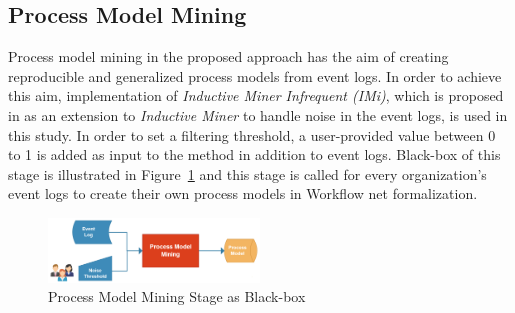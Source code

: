 \subsection{Process Model Mining}
\label{subsec:process-model-mining}
Process model mining in the proposed approach has the aim of creating reproducible and generalized process models from event logs. In order to achieve this aim, implementation of \textit{Inductive Miner Infrequent (IMi)}, which is proposed in \cite{leemans2014discoveringinfrequent} as an extension to \textit{Inductive Miner} to handle noise in the event logs, is used in this study. In order to set a filtering threshold, a user-provided value between 0 to 1 is added as input to the method in addition to event logs. Black-box of this stage is illustrated in Figure~\ref{fig:process-model-mining-blackbox} and this stage is called for every organization's event logs to create their own process models in Workflow net formalization.
\begin{figure}
  \centering
  \includegraphics[width=0.5\textwidth]{4_methodology/process-model-mining-blackbox}
  \caption{Process Model Mining Stage as Black-box }
  \label{fig:process-model-mining-blackbox}
\end{figure}

